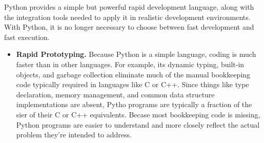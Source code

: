 \documentclass[10pt,relax]{SANDreport}
\begin{document}
Python provides a simple but powerful rapid development language, along with
the integration tools needed to apply it in realistic development
environments. With Python, it is no longer necessary to choose between fast
development and fast execution.   

\begin{itemize}
\item {\bf Rapid Prototyping.}
Because Python is a simple language, coding is much faster than in other
  languages. For example, its dynamic typing, built-in objects, and garbage
  collection eliminate much of the manual bookkeeping code typically required
  in languages like C or C++. Since things like type declaration, memory
  management, and common data structure implementations are absent, Pytho
  programs are typically a fraction of the sier of their C or C++ equivalents.
  Becase most bookkeeping code is missing, Python programs are easier to
  understand and more closely reflect the actual problem they're intended to
  address. 


\end{itemize}
\end{document}
